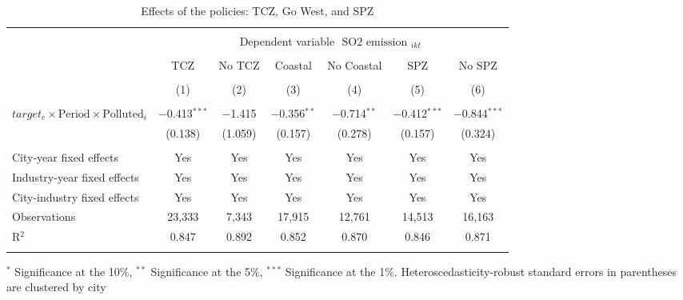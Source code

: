 \documentclass[12pt]{article}
\begin{document}
\begin{table}[!htb] \centering 
  \caption{\\ Effects of the policies: TCZ, Go West, and SPZ } 
\label{table_7}
\begin{adjustbox}{width=\textwidth, totalheight=\baselineskip,keepaspectratio}
\begin{tabular}{@{\extracolsep{5pt}}lcccccc} 
\\[-1.8ex]\hline 
\hline \\[-1.8ex] 
 & \multicolumn{6}{c}{Dependent variable $\text { SO2 emission }_{i k t}$} \\ 
\cline{2-7}
            
\\[-1.8ex]
            &\multicolumn{1}{c}{TCZ}&\multicolumn{1}{c}{No TCZ}&\multicolumn{1}{c}{ Coastal }&\multicolumn{1}{c}{No  Coastal}&\multicolumn{1}{c}{ SPZ }&\multicolumn{1}{c}{No  SPZ}\\
\\[-1.8ex] &  (1) &  (2) &  (3) &  (4) &  (5) &  (6)\\ 
\hline \\[-1.8ex] 
   $target_c \times \text{Period} \times \text{Polluted}_i$  &  $-$0.413$^{***}$ &   $-$1.415 &  $-$0.356$^{**}$ &   $-$0.714$^{**}$ &   $-$0.412$^{***}$ & $-$0.844$^{***}$ \\ 
  &   (0.138) &   (1.059) &  (0.157) &   (0.278) &   (0.157) &   (0.324) \\ 
 \hline \\[-1.8ex] 
City-year fixed effects &  Yes &  Yes &  Yes &  Yes &  Yes &  Yes \\ 
Industry-year fixed effects &  Yes &   Yes &   Yes &  Yes &   Yes &   Yes \\ 
City-industry fixed effects &   Yes &   Yes &   Yes &   Yes &   Yes &   Yes \\ 
Observations &   23,333 &   7,343 &   17,915 &   12,761 &   14,513 &   16,163 \\ 
R$^{2}$ &  0.847 &   0.892 &   0.852 &  0.870 &  0.846 &   0.871
 \\ 
\hline 
\hline \\[-1.8ex] 
\end{tabular}
\end{adjustbox}
\begin{tablenotes} 
 \small 
 \item
\footnotesize{
$^{*}$ Significance at the 10\%, $^{**}$ Significance at the 5\%, $^{***}$ Significance at the 1\%. Heteroscedasticity-robust standard errors in parentheses are clustered by city 
}
 
\end{tablenotes}
\end{table}
\end{document}
